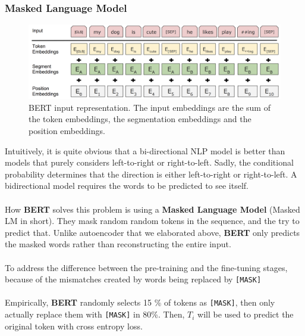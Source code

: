 \documentclass[paper=a4, fontsize=12pt]{scrartcl}
\begin{document}
\subsubsection{Masked Language Model}
 \begin{figure}
  \includegraphics[scale=0.53]{bertinput.png}
  \caption{BERT input representation. The input embeddings are the sum of the token embeddings, the segmentation embeddings and the position embeddings.}
  \label{fig:skip-gram}
\end{figure}
Intuitively,  it is quite obvious that a bi-directional NLP model is better than models that purely considers left-to-right or right-to-left. Sadly, the conditional probability determines that the direction is either left-to-right or right-to-left. A bidirectional model requires the words to be predicted to see itself. \\\\
How \textbf{BERT} solves this problem is using a \textbf{Masked Language Model} (Masked LM in short). They mask random random tokens in the sequence, and the try to predict that. Unlike autoencoder that we elaborated above, \textbf{BERT} only predicts the masked words rather than reconstructing the entire input. \\\\
To address the difference between the pre-training and the fine-tuning stages, because of the mismatches created by words being replaced by \texttt{[MASK]}\\\\
Empirically, \textbf{BERT} randomly selects 15 \% of tokens as \texttt{[MASK]}, then only actually replace them with \texttt{[MASK]} in 80\%. Then, $T_i$ will be used to predict the original token with cross entropy loss.
\end{document}
